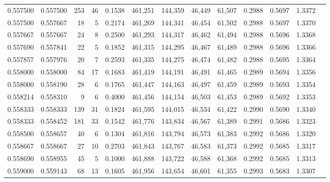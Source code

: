 \begin{tabular}{rrrrrrrrrrrrr}
0.557500 & 0.557500 &   253 &  46 &                                     0.1538 & 461,251 & 144,359 &  46,449 &  61,507 & 0.2988 & 0.5697 & 1.3372 \\
0.557500 & 0.557667 &    18 &   5 &                                     0.2174 & 461,269 & 144,341 &  46,454 &  61,502 & 0.2988 & 0.5697 & 1.3370 \\
0.557667 & 0.557667 &    24 &   8 &                                     0.2500 & 461,293 & 144,317 &  46,462 &  61,494 & 0.2988 & 0.5696 & 1.3368 \\
0.557690 & 0.557841 &    22 &   5 &                                     0.1852 & 461,315 & 144,295 &  46,467 &  61,489 & 0.2988 & 0.5696 & 1.3366 \\
0.557857 & 0.557976 &    20 &   7 &                                     0.2593 & 461,335 & 144,275 &  46,474 &  61,482 & 0.2988 & 0.5695 & 1.3364 \\
0.558000 & 0.558000 &    84 &  17 &                                     0.1683 & 461,419 & 144,191 &  46,491 &  61,465 & 0.2989 & 0.5694 & 1.3356 \\
0.558000 & 0.558190 &    28 &   6 &                                     0.1765 & 461,447 & 144,163 &  46,497 &  61,459 & 0.2989 & 0.5693 & 1.3354 \\
0.558214 & 0.558310 &     9 &   6 &                                     0.4000 & 461,456 & 144,154 &  46,503 &  61,453 & 0.2989 & 0.5692 & 1.3353 \\
0.558333 & 0.558333 &   139 &  31 &                                     0.1824 & 461,595 & 144,015 &  46,534 &  61,422 & 0.2990 & 0.5690 & 1.3340 \\
0.558333 & 0.558452 &   181 &  33 &                                     0.1542 & 461,776 & 143,834 &  46,567 &  61,389 & 0.2991 & 0.5686 & 1.3323 \\
0.558500 & 0.558657 &    40 &   6 &                                     0.1304 & 461,816 & 143,794 &  46,573 &  61,383 & 0.2992 & 0.5686 & 1.3320 \\
0.558667 & 0.558667 &    27 &  10 &                                     0.2703 & 461,843 & 143,767 &  46,583 &  61,373 & 0.2992 & 0.5685 & 1.3317 \\
0.558690 & 0.558955 &    45 &   5 &                                     0.1000 & 461,888 & 143,722 &  46,588 &  61,368 & 0.2992 & 0.5685 & 1.3313 \\
0.559000 & 0.559143 &    68 &  13 &                                     0.1605 & 461,956 & 143,654 &  46,601 &  61,355 & 0.2993 & 0.5683 & 1.3307 \\

\end{tabular}
